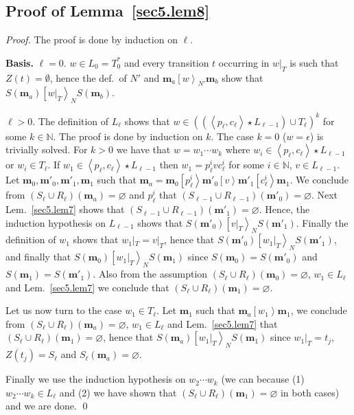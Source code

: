 \documentclass{fsttcs}
\def\tuple#1{{\left\langle #1 \right\rangle}}
\def\nats{{\mathbb{N}}}
\def\mmap{\mathbf{m}}
\newcommand{\fire}[1]{\left[ {#1}\right\rangle}
\begin{document}
\subsection{Proof of Lemma~\ref{sec5.lem8}}

\begin{proof} The proof is done by induction on \(\ell\). 
\medskip

\noindent
{\bf Basis.} $\ell=0$.
\(w\in L_{0}=T_0^*\) and every transition \(t\) occurring in \(w|_{T}\) is such
that \(Z(t)=\emptyset\), hence the def.\ of \(N'\) and \(\mmap_a\fire{w}_{N'}\mmap_b\) show that \(S(\mmap_{a})\fire{w|_{T}}_{N} S(\mmap_b)\).

\medskip

 $\ell>0$.
The definition of \(L_{\ell}\) shows that \(w\in((\tuple{p_{\ell},c_{\ell}}\star
L_{\ell-1}) \cup T_{\ell})^k\) for some \(k\in\nats\). The proof is done by
induction on \(k\). The case \(k=0\) (\(w=\epsilon\)) is trivially solved. For
\(k>0\) we have that \(w=w_1\cdots w_k\) where \(w_i\in
\tuple{p_{\ell},c_{\ell}}\star L_{\ell-1}\) or \(w_i\in T_{\ell}\).  If
\(w_1\in \tuple{p_{\ell},c_{\ell}}\star L_{\ell-1}\) then \(w_1= p_{\ell}^{i} v
c_{\ell}^{i}\) for some \(i\in\nats\), \(v\in L_{\ell-1}\).  Let
\(\mmap_0,\mmap'_{0},\mmap'_{1},\mmap_{1}\) such that
\(\mmap_a=\mmap_0\fire{p_{\ell}^{i}}\mmap'_{0}\fire{v}\mmap'_{1}\fire{c_{\ell}^{i}}\mmap_{1}\).
We conclude from \((S_{\ell}\cup R_{\ell})(\mmap_{a})=\varnothing\) and
\(p_{\ell}^{i}\) that \((S_{\ell-1}\cup
R_{\ell-1})(\mmap'_{0})=\varnothing\).  Next Lem.~\ref{sec5.lem7} shows that \(
(S_{\ell-1}\cup R_{\ell-1})(\mmap'_{1})=\varnothing\).  Hence, the induction
hypothesis on \(L_{\ell-1}\) shows that \(S(\mmap'_{0})\fire{v|_{T}}_N
S(\mmap'_{1})\). Finally the definition of \(w_1\) shows that \(w_1|_{T}=v|_{T}\),
hence that \(S(\mmap'_{0})\fire{w_1|_{T}}_N S(\mmap'_{1})\), and finally that
\(S(\mmap_0)\fire{w_1|_{T}}_N S(\mmap_{1})\) since \(S(\mmap_0)=S(\mmap'_{0})\) and
\(S(\mmap_{1})=S(\mmap'_{1})\).  
Also from the assumption \( (S_{\ell}\cup R_{\ell})(\mmap_0)=\varnothing\),
\(w_1\in L_{\ell}\) and Lem.~\ref{sec5.lem7} we conclude that \( (S_{\ell}\cup
R_{\ell})(\mmap_{1})=\varnothing\).

Let us now turn to the case \(w_1\in T_{\ell}\).  Let \(\mmap_1\) such that
\(\mmap_a\fire{w_1}\mmap_1\), we conclude from \((S_{\ell}\cup
R_{\ell})(\mmap_{a})=\varnothing\), \(w_1\in L_{\ell}\) and Lem.~\ref{sec5.lem7} that
\((S_{\ell}\cup R_{\ell})(\mmap_1)=\varnothing\), hence that
\(S(\mmap_{a})\fire{w_1|_{T}}_{N}S(\mmap_1)\) since \(w_1|_{T}=t_j\),
\(Z(t_j)=S_{\ell}\) and \(S_{\ell}(\mmap_{a})=\varnothing\). 

Finally we use the induction hypothesis on \(w_2\cdots w_k\) (we can because
(1) \(w_2\cdots w_k\in  L_{\ell}\) and (2) we have shown that \((S_{\ell}\cup
R_{\ell})(\mmap_1)=\varnothing\) in both cases) and we are done.
\qed
\end{proof}
\end{document}
